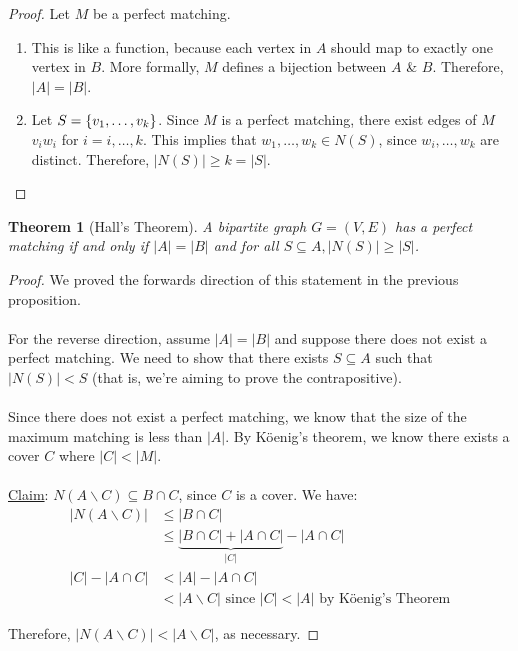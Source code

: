 \documentclass[]{article}
\newtheorem*{theorem}{Theorem}
\theoremstyle{definition}
\newcommand{\lecture}[1]{\marginpar{{\footnotesize $\leftarrow$ \underline{#1}}}}
\DeclarePairedDelimiter{\set}{\lbrace}{\rbrace}
\begin{document}
			\begin{proof}
				Let $M$ be a perfect matching.
				\begin{enumerate}
					\item This is like a function, because each vertex in $A$ should map to exactly one vertex in $B$. More formally, $M$ defines a bijection between $A$ \& $B$. Therefore, $|A| = |B|$.
					\item Let $S = \set{v_1, \ldots, v_k}$. Since $M$ is a perfect matching, there exist edges of $M$ $v_i w_i$ for $i = i, \ldots, k$. This implies that $w_1, \ldots, w_k \in N(S)$, since $w_i, \ldots, w_k$ are distinct. Therefore, $|N(S)| \ge k = |S|$.
				\end{enumerate}
			\end{proof}
			
			\begin{theorem}[Hall's Theorem]
				A bipartite graph $G = (V, E)$ has a perfect matching if and only if $|A| = |B|$ and for all $S \subseteq A, |N(S)| \ge |S|$.
			\end{theorem}
			
			\begin{proof} \lecture{April 8, 2013}
				We proved the forwards direction of this statement in the previous proposition.
				\\ \\
				For the reverse direction, assume $|A| = |B|$ and suppose there does not exist a perfect matching. We need to show that there exists $S \subseteq A$ such that $|N(S)| < S$ (that is, we're aiming to prove the contrapositive).
				\\ \\
				Since there does not exist a perfect matching, we know that the size of the maximum matching is less than $|A|$. By K\"oenig's theorem, we know there exists a cover $C$ where $|C| < |M|$.
				\\ \\
				\underline{Claim}: $N(A \backslash C) \subseteq B \cap C$, since $C$ is a cover. We have:
				\begin{align*}
					|N(A \backslash C)| &\le |B \cap C| \\
					&\le \underbrace{|B \cap C| + |A \cap C|}_{|C|} - |A \cap C| \\
					|C| - |A \cap C| &< |A| - |A \cap C| \\
					&< |A \backslash C| \text{ since } |C| < |A| \text{ by K\"oenig's Theorem}
				\end{align*}
				
				Therefore, $|N(A \backslash C)| < |A \backslash C|$, as necessary.
			\end{proof}
			
\end{document}
